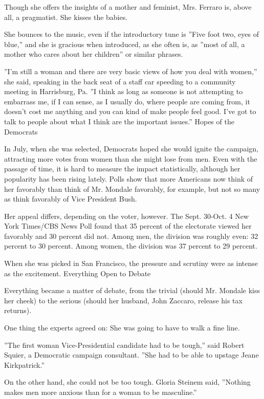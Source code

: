 Though she offers the insights of a mother and feminist, Mrs. Ferraro
is, above all, a pragmatist. She kisses the babies.

She bounces to the music, even if the introductory tune is ''Five foot
two, eyes of blue,'' and she is gracious when introduced, as she often
is, as ''most of all, a mother who cares about her children'' or similar
phrases.

''I'm still a woman and there are very basic views of how you deal with
women,'' she said, speaking in the back seat of a staff car speeding to
a community meeting in Harrisburg, Pa. ''I think as long as someone is
not attempting to embarrass me, if I can sense, as I usually do, where
people are coming from, it doesn't cost me anything and you can kind of
make people feel good. I've got to talk to people about what I think are
the important issues.'' Hopes of the Democrats

In July, when she was selected, Democrats hoped she would ignite the
campaign, attracting more votes from women than she might lose from men.
Even with the passage of time, it is hard to measure the impact
statistically, although her popularity has been rising lately. Polls
show that more Americans now think of her favorably than think of Mr.
Mondale favorably, for example, but not so many as think favorably of
Vice President Bush.

Her appeal differs, depending on the voter, however. The Sept. 30-Oct. 4
New York Times/CBS News Poll found that 35 percent of the electorate
viewed her favorably and 30 percent did not. Among men, the division was
roughly even: 32 percent to 30 percent. Among women, the division was 37
percent to 29 percent.

When she was picked in San Francisco, the pressure and scrutiny were as
intense as the excitement. Everything Open to Debate

Everything became a matter of debate, from the trivial (should Mr.
Mondale kiss her cheek) to the serious (should her husband, John
Zaccaro, release his tax returns).

One thing the experts agreed on: She was going to have to walk a fine
line.

''The first woman Vice-Presidential candidate had to be tough,'' said
Robert Squier, a Democratic campaign consultant. ''She had to be able to
upstage Jeane Kirkpatrick.''

On the other hand, she could not be too tough. Gloria Steinem said,
''Nothing makes men more anxious than for a woman to be masculine.''

